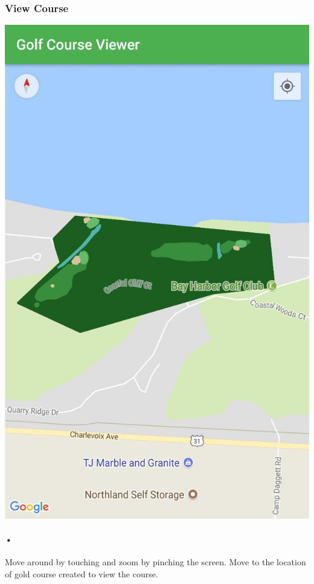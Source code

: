 \documentclass{article}
\begin{document}
	\subsubsection{View Course}
	    \includegraphics[scale=0.2]{mobilemap.jpg}
	
	\paragraph{•}
	Move around by touching and zoom by pinching the screen. Move to the location of gold course created to view the course.
	
\end{document}
